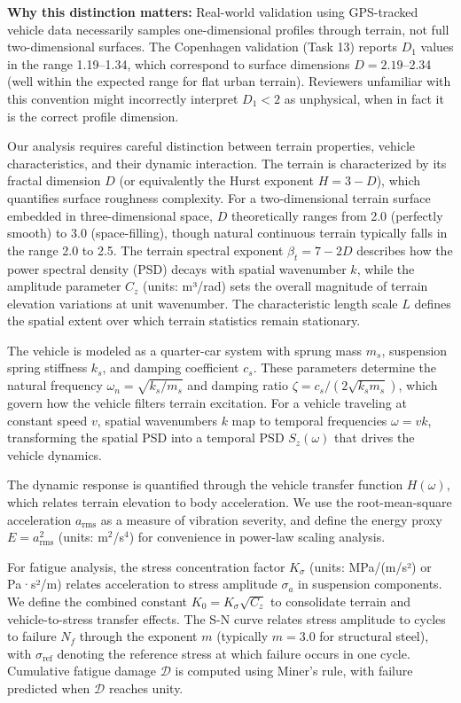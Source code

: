 \documentclass[11pt,letterpaper]{article}
\begin{document}
\textbf{Why this distinction matters:} Real-world validation using GPS-tracked vehicle data necessarily samples one-dimensional profiles through terrain, not full two-dimensional surfaces. The Copenhagen validation (Task 13) reports $D_1$ values in the range 1.19--1.34, which correspond to surface dimensions $D = 2.19$--2.34 (well within the expected range for flat urban terrain). Reviewers unfamiliar with this convention might incorrectly interpret $D_1 < 2$ as unphysical, when in fact it is the correct profile dimension.

\vspace{0.5cm}

Our analysis requires careful distinction between terrain properties, vehicle characteristics, and their dynamic interaction. The terrain is characterized by its fractal dimension $D$ (or equivalently the Hurst exponent $H = 3-D$), which quantifies surface roughness complexity. For a two-dimensional terrain surface embedded in three-dimensional space, $D$ theoretically ranges from 2.0 (perfectly smooth) to 3.0 (space-filling), though natural continuous terrain typically falls in the range 2.0 to 2.5. The terrain spectral exponent $\beta_t = 7-2D$ describes how the power spectral density (PSD) decays with spatial wavenumber $k$, while the amplitude parameter $C_z$ (units: m³/rad) sets the overall magnitude of terrain elevation variations at unit wavenumber. The characteristic length scale $L$ defines the spatial extent over which terrain statistics remain stationary.

The vehicle is modeled as a quarter-car system with sprung mass $m_s$, suspension spring stiffness $k_s$, and damping coefficient $c_s$. These parameters determine the natural frequency $\omega_n = \sqrt{k_s/m_s}$ and damping ratio $\zeta = c_s/(2\sqrt{k_s m_s})$, which govern how the vehicle filters terrain excitation. For a vehicle traveling at constant speed $v$, spatial wavenumbers $k$ map to temporal frequencies $\omega = vk$, transforming the spatial PSD into a temporal PSD $S_z(\omega)$ that drives the vehicle dynamics.

The dynamic response is quantified through the vehicle transfer function $H(\omega)$, which relates terrain elevation to body acceleration. We use the root-mean-square acceleration $a_{\text{rms}}$ as a measure of vibration severity, and define the energy proxy $E = a_{\text{rms}}^2$ (units: m$^2$/s$^4$) for convenience in power-law scaling analysis.

For fatigue analysis, the stress concentration factor $K_\sigma$ (units: MPa/(m/s²) or Pa·s²/m) relates acceleration to stress amplitude $\sigma_a$ in suspension components. We define the combined constant $K_0 = K_\sigma\sqrt{C_z}$ to consolidate terrain and vehicle-to-stress transfer effects. The S-N curve relates stress amplitude to cycles to failure $N_f$ through the exponent $m$ (typically $m = 3.0$ for structural steel), with $\sigma_{\text{ref}}$ denoting the reference stress at which failure occurs in one cycle. Cumulative fatigue damage $\mathcal{D}$ is computed using Miner's rule, with failure predicted when $\mathcal{D}$ reaches unity.
\end{document}
